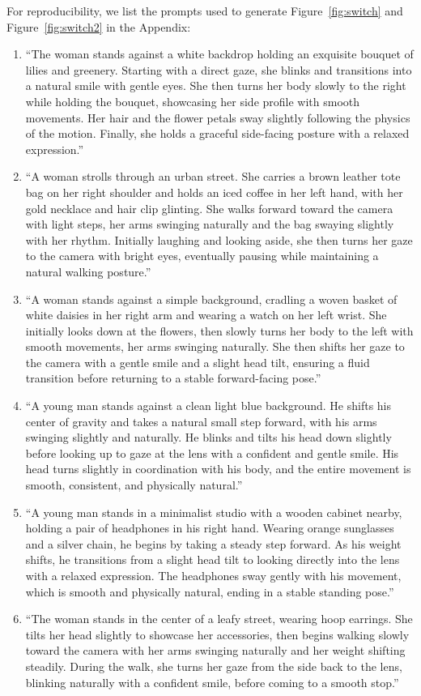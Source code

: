 \documentclass{llmxive}
\begin{document}
For reproducibility, we list the prompts used to generate Figure~\ref{fig:switch} and Figure~\ref{fig:switch2} in the Appendix:
\begin{enumerate}
\item ``The woman stands against a white backdrop holding an exquisite bouquet of lilies and greenery. Starting with a direct gaze, she blinks and transitions into a natural smile with gentle eyes. She then turns her body slowly to the right while holding the bouquet, showcasing her side profile with smooth movements. Her hair and the flower petals sway slightly following the physics of the motion. Finally, she holds a graceful side-facing posture with a relaxed expression.''
% 
\item ``A woman strolls through an urban street. She carries a brown leather tote bag on her right shoulder and holds an iced coffee in her left hand, with her gold necklace and hair clip glinting. She walks forward toward the camera with light steps, her arms swinging naturally and the bag swaying slightly with her rhythm. Initially laughing and looking aside, she then turns her gaze to the camera with bright eyes, eventually pausing while maintaining a natural walking posture.''
% 
\item ``A woman stands against a simple background, cradling a woven basket of white daisies in her right arm and wearing a watch on her left wrist. She initially looks down at the flowers, then slowly turns her body to the left with smooth movements, her arms swinging naturally. She then shifts her gaze to the camera with a gentle smile and a slight head tilt, ensuring a fluid transition before returning to a stable forward-facing pose.''
% 
\item ``A young man stands against a clean light blue background. He shifts his center of gravity and takes a natural small step forward, with his arms swinging slightly and naturally. He blinks and tilts his head down slightly before looking up to gaze at the lens with a confident and gentle smile. His head turns slightly in coordination with his body, and the entire movement is smooth, consistent, and physically natural.''
% 
\item ``A young man stands in a minimalist studio with a wooden cabinet nearby, holding a pair of headphones in his right hand. Wearing orange sunglasses and a silver chain, he begins by taking a steady step forward. As his weight shifts, he transitions from a slight head tilt to looking directly into the lens with a relaxed expression. The headphones sway gently with his movement, which is smooth and physically natural, ending in a stable standing pose.''
% 
\item ``The woman stands in the center of a leafy street, wearing hoop earrings. She tilts her head slightly to showcase her accessories, then begins walking slowly toward the camera with her arms swinging naturally and her weight shifting steadily. During the walk, she turns her gaze from the side back to the lens, blinking naturally with a confident smile, before coming to a smooth stop.''
\end{enumerate}
\end{document}
